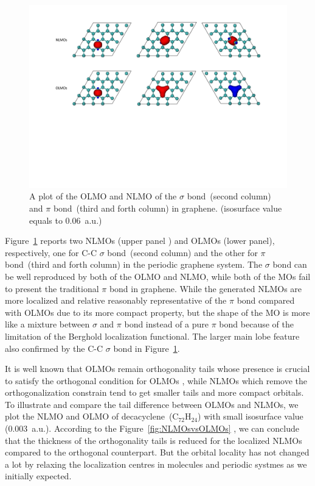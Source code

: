 \documentclass[aps,prl,reprint,amsmath,amssymb]{revtex4-1}
\begin{document}
\begin{figure}[hbpt]
\centering
\includegraphics[width=\textwidth]{figure_4.pdf}
\caption{A plot of the OLMO and NLMO of the $\sigma$ bond~(second column) and $\pi$ bond~(third and forth column) in graphene. (isosurface value equals to  0.06~a.u.)}
\label{fig:graphene}
\end{figure}

Figure~\ref{fig:graphene} reports two NLMOs (upper panel ) and OLMOs (lower panel), respectively, one for C-C $\sigma$ bond~(second column) and the other for $\pi$ bond~(third and forth column) in the periodic graphene system.
The $\sigma$ bond can be well reproduced by both of the OLMO and NLMO, while both of the MOs fail to present the traditional $\pi$ bond in graphene.
While the generated NLMOs are more localized and  relative reasonably representative of the $\pi$ bond compared with OLMOs due to its more compact property, but the shape of the MO is more like a mixture between $\sigma$ and $\pi$ bond instead of a pure $\pi$ bond because of the limitation of the Berghold localization functional.
The larger main lobe feature also confirmed by the C-C $\sigma$ bond in Figure~\ref{fig:graphene}.

It is well known that OLMOs remain orthogonality tails whose presence is crucial to satisfy the orthogonal condition for OLMOs , while NLMOs which remove the orthogonalization constrain tend to get smaller tails and more compact orbitals. 
To illustrate and compare the tail difference between OLMOs and NLMOs, we plot the NLMO and OLMO of decacyclene~(C$_{72}$H$_{24}$) with small isosurface value (0.003~a.u.).
According to the Figure~\ref{fig:NLMOsvsOLMOs} , we can conclude that the thickness of the orthogonality tails is reduced for the localized NLMOs compared to the orthogonal counterpart.
But the orbital locality has not changed a lot by relaxing the localization centres in molecules and periodic systmes as we initially expected.
\end{document}
